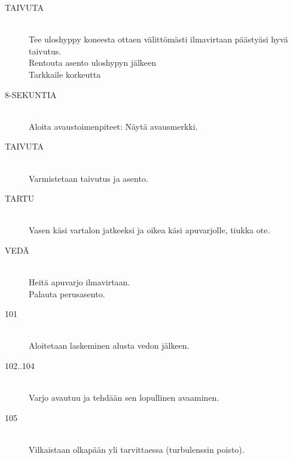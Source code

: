 \begin{description}
\item[TAIVUTA] \hfill \\ 
Tee uloshyppy koneesta ottaen välittömästi ilmavirtaan päästyäsi hyvä taivutus.  \hfill \\ 
Rentouta asento uloshypyn jälkeen  \hfill \\ 
Tarkkaile korkeutta  \hfill \\ 
\end{description}
\begin{description}
\item[8-SEKUNTIA ] \hfill \\ 
Aloita avaustoimenpiteet: Näytä avausmerkki.  \hfill \\ 
\end{description}
\begin{description}
\item[TAIVUTA] \hfill \\ 
Varmistetaan taivutus ja asento.  \hfill \\ 
\item[TARTU] \hfill \\ 
Vasen käsi vartalon jatkeeksi ja oikea käsi apuvarjolle, tiukka ote. \hfill \\ 
\end{description}
\begin{description}
\item[VEDÄ] \hfill \\ 
Heitä apuvarjo ilmavirtaan. \hfill \\ 
Palauta perusasento.  \hfill \\ 
\end{description}
\begin{description}
\item[101] \hfill \\ 
Aloitetaan laskeminen alusta vedon jälkeen.  \hfill \\ 
\item[102..104] \hfill \\ 
Varjo avautuu ja tehdään sen lopullinen avaaminen.  \hfill \\ 
\item[105] \hfill \\ 
Vilkaistaan olkapään yli tarvittaessa (turbulenssin poisto). \hfill \\ 
\end{description}

